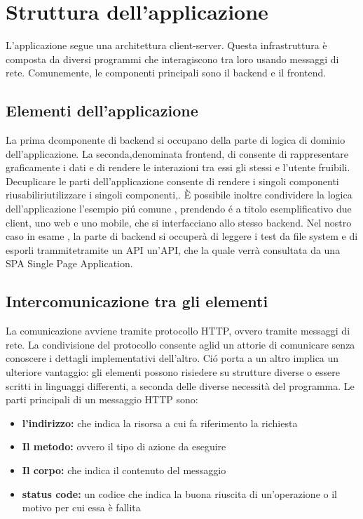 \chapter{Struttura dell'applicazione}
    L'applicazione segue una architettura client-server.
    Questa infrastruttura è composta da diversi programmi che interagiscono tra loro usando messaggi di rete.
    Comunemente, le componenti principali sono il backend e il frontend.    

    \section{Elementi dell'applicazione}
        La prima dcomponente di backend si occupano della parte di logica di dominio dell'applicazione.
        La seconda,denominata frontend, di  consente di rappresentare graficamente i dati e di rendere le interazioni tra essi gli stessi e l'utente fruibili.
        Decuplicare le parti dell'applicazione consente di rendere i singoli componenti riusabiliriutilizzare i singoli componenti,. 
        È possibile inoltre condividere la logica dell'applicazione  l'esempio pi\'u comune , prendendo \'e a titolo esemplificativo due client, uno web e uno mobile, che si interfacciano allo stesso backend.
        Nel nostro  caso in esame , la parte di backend si occuperà di leggere i test da file system e di esporli trammitetramite un API un'API,
        che la quale verrà consultata da una SPA Single Page Application.

    \section{Intercomunicazione tra gli elementi}
        La comunicazione avviene tramite protocollo HTTP, ovvero tramite messaggi di rete.
        La condivisione del protocollo consente aglid un attorie di comunicare senza conoscere i dettagli implementativi dell'altro.
        Ci\'o porta a un altro implica un ulteriore vantaggio: gli elementi possono risiedere su strutture diverse o essere scritti in linguaggi differenti, a seconda delle diverse necessità del programma.
        Le parti principali di un messaggio HTTP sono:
        \begin{itemize}
            \item \textbf{l’indirizzo:} che indica la risorsa a cui fa riferimento la richiesta
            \item \textbf{Il metodo:} ovvero il tipo di azione da eseguire 
            \item \textbf{Il corpo:} che indica il contenuto del messaggio
            \item \textbf{status code:} un codice che indica la buona riuscita di un'operazione o il motivo per cui essa è fallita 
        \end{itemize}

